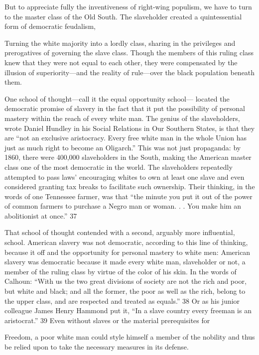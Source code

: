  \par 
But to appreciate fully the inventiveness of right-wing populism, we have to turn to the master class of the Old South. The slaveholder created a quintessential form of democratic feudalism,
 \par 
Turning the white majority into a lordly class, sharing in the privileges and prerogatives of governing the slave class. Though the members of this ruling class knew that they were not equal to each other, they were compensated by the illusion of superiority—and the reality of rule—over the black population beneath them.
 \par 
One school of thought—call it the equal opportunity school— located the democratic promise of slavery in the fact that it put the possibility of personal mastery within the reach of every white man. The genius of the slaveholders, wrote Daniel Hundley in his Social Relations in Our Southern States, is that they are “not an exclusive aristocracy. Every free white man in the whole Union has just as much right to become an Oligarch.” This was not just propaganda: by 1860, there were 400,000 slaveholders in the South, making the American master class one of the most democratic in the world. The slaveholders repeatedly attempted to pass laws' encouraging whites to own at least one slave and even considered granting tax breaks to facilitate such ownership. Their thinking, in the words of one Tennessee farmer, was that “the minute you put it out of the power of common farmers to purchase a Negro man or woman. . . You make him an abolitionist at once.” 37
 \par 
That school of thought contended with a second, arguably more influential, school. American slavery was not democratic, according to this line of thinking, because it off and the opportunity for personal mastery to white men: American slavery was democratic because it made every white man, slaveholder or not, a member of the ruling class by virtue of the color of his skin. In the words of Calhoun: “With us the two great divisions of society are not the rich and poor, but white and black; and all the former, the poor as well as the rich, belong to the upper class, and are respected and treated as equals.” 38 Or as his junior colleague James Henry Hammond put it, “In a slave country every freeman is an aristocrat.” 39 Even without slaves or the material prerequisites for
 \par 
Freedom, a poor white man could style himself a member of the nobility and thus be relied upon to take the necessary measures in its defense.

